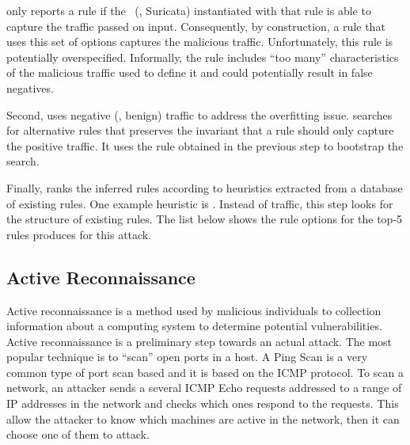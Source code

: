 \documentclass[sigconf,anonymous]{acmart}
\begin{document}
  


\tname{} only reports a rule if the \nids\ (\ie{}, Suricata)
instantiated with that rule is able to capture the traffic passed on
input. Consequently, by construction, a rule that uses this set of
options captures the malicious traffic. Unfortunately, this rule is
potentially overspecified. Informally, the rule includes ``too many''
characteristics of the malicious traffic used to define it and could
potentially result in false negatives.

Second, \tname{} uses negative (\ie{}, benign) traffic to address the
overfitting issue. \tname{} searches for alternative rules that
preserves the invariant that a rule should only capture the positive
traffic. It uses the rule obtained in the previous step to bootstrap
the search.

Finally, \tname{} ranks the inferred rules according to heuristics
extracted from a database of existing \tname{} rules. One example
heuristic is . Instead of traffic, this step looks for the
structure of existing rules. The list below shows the rule options for
the top-5 rules \tname{} produces for this attack.



\subsection{Active Reconnaissance}

Active reconnaissance is a method used by malicious individuals to
collection information about a computing system to determine potential
vulnerabilities. Active reconnaissance is a preliminary step towards
an actual attack. The most popular technique is to ``scan'' open ports
in a host. A Ping Scan is a very common type of port scan based and it
is based on the ICMP protocol. 
   To scan a network, an attacker sends a several
ICMP Echo requests addressed to a range of IP addresses in the network
and checks which ones respond to the requests. This allow the attacker
to know which machines are active in the network, then it can choose
one of them to attack.
\end{document}

